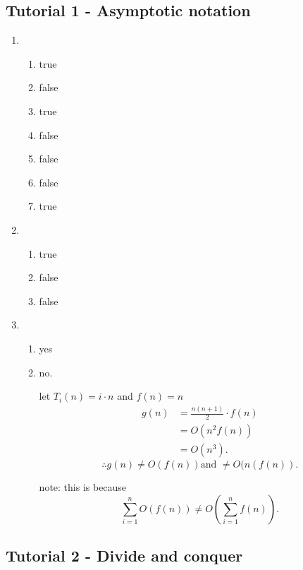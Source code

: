\documentclass[../../main/main.tex]{subfiles}
\begin{document}
\subsection{Tutorial 1 - Asymptotic notation}
\begin{enumerate}
	\item \begin{enumerate}
		      \item  true
		      \item false
		      \item true
		      \item false
		      \item false
		      \item false
		      \item true
	      \end{enumerate}
	\item \begin{enumerate}
		      \item true
		      \item false
		      \item false
	      \end{enumerate}
	\item \begin{enumerate}
		      \item yes
		      \item no.

		            let $T_{i}(n) = i \cdot n$ and $f(n) = n$
		            \begin{align*}
			            g(n) & = \frac{n(n+1)}{2} \cdot f(n) \\
			                 & = O(n^2f(n))                  \\
			                 & = O(n^3)
			            .\end{align*}
		            \[
			            \therefore g(n) \neq O(f(n)) \text{and }\neq O(n(f(n))
			            .\]

		            note: this is because
		            \[
			            \sum^{n}_{i=1}  O(f(n)) \neq  O(\sum^{n}_{i=1} f(n))
			            .\]
	      \end{enumerate}
\end{enumerate}

\subsection{Tutorial 2 - Divide and conquer}
\end{document}
